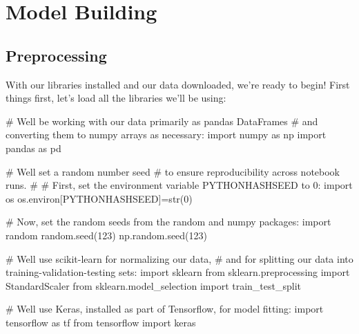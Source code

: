 \documentclass[
  letterpaper,
  DIV=11,
  numbers=noendperiod]{scrartcl}
\newenvironment{Shaded}{\begin{snugshade}}{\end{snugshade}}
\newcommand{\BuiltInTok}[1]{\textcolor[rgb]{0.00,0.23,0.31}{#1}}
\newcommand{\CommentTok}[1]{\textcolor[rgb]{0.37,0.37,0.37}{#1}}
\newcommand{\DecValTok}[1]{\textcolor[rgb]{0.68,0.00,0.00}{#1}}
\newcommand{\ImportTok}[1]{\textcolor[rgb]{0.00,0.46,0.62}{#1}}
\newcommand{\NormalTok}[1]{\textcolor[rgb]{0.00,0.23,0.31}{#1}}
\newcommand{\OperatorTok}[1]{\textcolor[rgb]{0.37,0.37,0.37}{#1}}
\newcommand{\StringTok}[1]{\textcolor[rgb]{0.13,0.47,0.30}{#1}}
\begin{document}
\hypertarget{model-building}{%
\section{Model Building}\label{model-building}}

\hypertarget{preprocessing}{%
\subsection{Preprocessing}\label{preprocessing}}

With our libraries installed and our data downloaded, we're ready to
begin! First things first, let's load all the libraries we'll be using:

\begin{Shaded}
\begin{Highlighting}[]
\CommentTok{\# We\textquotesingle{}ll be working with our data primarily as pandas DataFrames}
\CommentTok{\# and converting them to numpy arrays as necessary:}
\ImportTok{import}\NormalTok{ numpy }\ImportTok{as}\NormalTok{ np}
\ImportTok{import}\NormalTok{ pandas }\ImportTok{as}\NormalTok{ pd}

\CommentTok{\# We\textquotesingle{}ll set a random number seed }
\CommentTok{\# to ensure reproducibility across notebook runs.}
\CommentTok{\#}
\CommentTok{\# First, set the environment variable \textquotesingle{}PYTHONHASHSEED\textquotesingle{} to 0:}
\ImportTok{import}\NormalTok{ os}
\NormalTok{os.environ[}\StringTok{\textquotesingle{}PYTHONHASHSEED\textquotesingle{}}\NormalTok{]}\OperatorTok{=}\BuiltInTok{str}\NormalTok{(}\DecValTok{0}\NormalTok{)}

\CommentTok{\# Now, set the random seeds from the \textasciigrave{}random\textasciigrave{} and \textasciigrave{}numpy\textasciigrave{} packages:}
\ImportTok{import}\NormalTok{ random}
\NormalTok{random.seed(}\DecValTok{123}\NormalTok{)}
\NormalTok{np.random.seed(}\DecValTok{123}\NormalTok{)}

\CommentTok{\# We\textquotesingle{}ll use scikit{-}learn for normalizing our data,}
\CommentTok{\# and for splitting our data into training{-}validation{-}testing sets:}
\ImportTok{import}\NormalTok{ sklearn}
\ImportTok{from}\NormalTok{ sklearn.preprocessing }\ImportTok{import}\NormalTok{ StandardScaler}
\ImportTok{from}\NormalTok{ sklearn.model\_selection }\ImportTok{import}\NormalTok{ train\_test\_split}

\CommentTok{\# We\textquotesingle{}ll use Keras, installed as part of Tensorflow, for model fitting:}
\ImportTok{import}\NormalTok{ tensorflow }\ImportTok{as}\NormalTok{ tf}
\ImportTok{from}\NormalTok{ tensorflow }\ImportTok{import}\NormalTok{ keras}


\end{Highlighting}
\end{Shaded}
\end{document}
